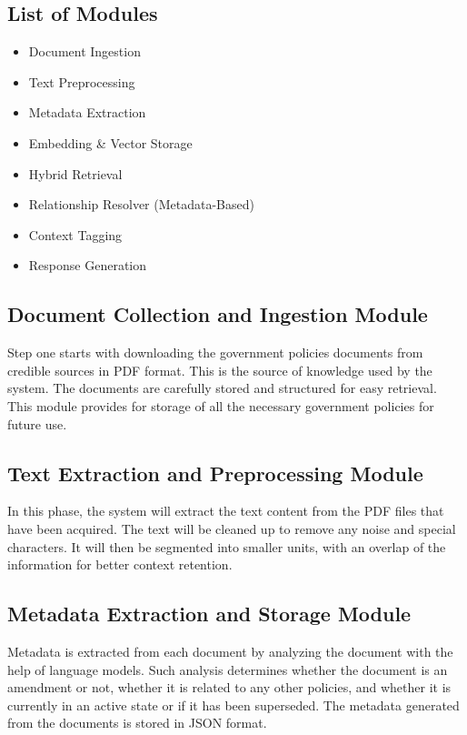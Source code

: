 \documentclass[conference]{IEEEtran}
\begin{document}
\subsection{List of Modules}
\begin{itemize}
    \item Document Ingestion
    \item Text Preprocessing
    \item Metadata Extraction
    \item Embedding \& Vector Storage
    \item Hybrid Retrieval
    \item Relationship Resolver (Metadata-Based)
    \item Context Tagging
    \item Response Generation
\end{itemize}

\subsection{Document Collection and Ingestion Module}
Step one starts with downloading the government policies documents from credible sources in PDF format. This is the source of knowledge used by the system. The documents are carefully stored and structured for easy retrieval. This module provides for storage of all the necessary government policies for future use.

\subsection{Text Extraction and Preprocessing Module}
In this phase, the system will extract the text content from the PDF files that have been acquired. The text will be cleaned up to remove any noise and special characters. It will then be segmented into smaller units, with an overlap of the information for better context retention.

\subsection{Metadata Extraction and Storage Module}
Metadata is extracted from each document by analyzing the document with the help of language models. Such analysis determines whether the document is an amendment or not, whether it is related to any other policies, and whether it is currently in an active state or if it has been superseded. The metadata generated from the documents is stored in JSON format.
\end{document}

